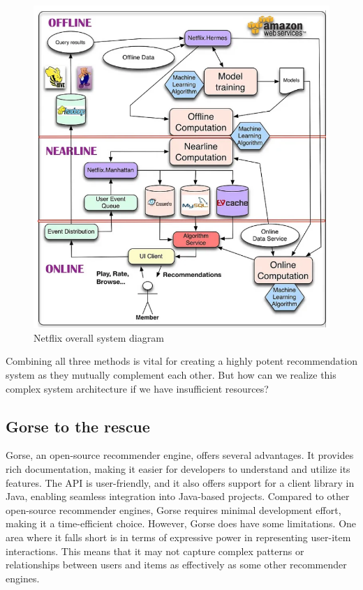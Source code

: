 \begin{figure}[H]
    \centering
    \includegraphics[width=0.7\linewidth]{image/Architecture/netflix.png}
    \caption{Netflix overall system diagram}
    \label{fig:enter-label}
\end{figure}

\noindent Combining all three methods is vital for creating a highly potent recommendation system as they mutually complement each other. But how can we realize this complex system architecture if we have insufficient resources?

\subsection{Gorse to the rescue}

\noindent Gorse, an open-source recommender engine, offers several advantages. It provides rich documentation, making it easier for developers to understand and utilize its features. The API is user-friendly, and it also offers support for a client library in Java, enabling seamless integration into Java-based projects. Compared to other open-source recommender engines, Gorse requires minimal development effort, making it a time-efficient choice. However, Gorse does have some limitations. One area where it falls short is in terms of expressive power in representing user-item interactions. This means that it may not capture complex patterns or relationships between users and items as effectively as some other recommender engines.

